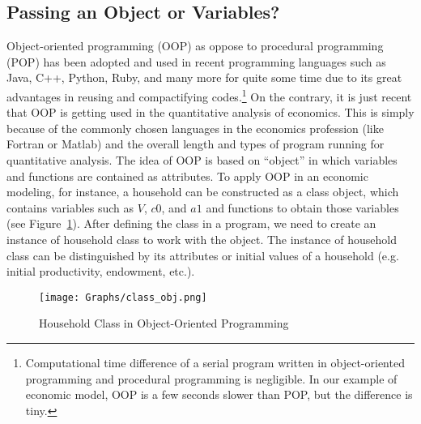 \documentclass[12pt]{article}
\begin{document}
\subsection{Passing an Object or Variables?}
Object-oriented programming (OOP) as oppose to procedural programming (POP) has been adopted and used in recent programming languages such as Java, C++, Python, Ruby, and many more for quite some time due to its great advantages in reusing and compactifying codes.\footnote{\sf Computational time difference of a serial program written in object-oriented programming and procedural programming is negligible. In our example of economic model, OOP is a few seconds slower than POP, but the difference is tiny.} On the contrary, it is just recent that OOP is getting used in the quantitative analysis of economics. This is simply because of the commonly chosen languages in the economics profession (like Fortran or Matlab) and the overall length and types of program running for quantitative analysis. The idea of OOP is based on ``object'' in which variables and functions are contained as attributes. To apply OOP in an economic modeling, for instance, a household can be constructed as a class object, which contains variables such as $V$, $c0$, and $a1$ and functions to obtain those variables (see Figure~\ref{fig:oop}). After defining the class in a program, we need to create an instance of household class to work with the object. The instance of household class can be distinguished by its attributes or initial values of a household (e.g. initial productivity, endowment, etc.).


\begin{figure}[t!]
\sf
\begin{center}
\caption{\sf Household Class in Object-Oriented Programming}
\texttt{[image: Graphs/class\_obj.png]}\label{fig:oop}
\end{center}
\end{figure}
\end{document}
